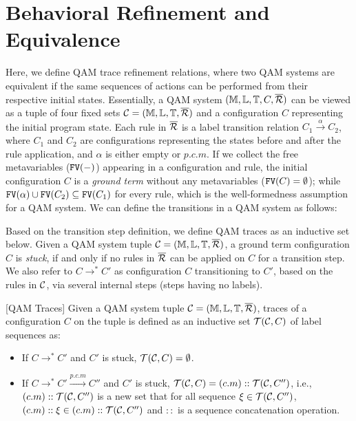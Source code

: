 \section{Behavioral Refinement and Equivalence} \label{sec:refinement}

Here, we define QAM trace refinement relations, where two QAM systems are equivalent if the same sequences of actions can be performed
from their respective initial states.
Essentially, a QAM system $(\mathbb{M},\mathbb{L},\mathbb{T},C,\overline{\mathcal{R}})$
can be viewed as a tuple of four fixed sets $\mathcal{C}=(\mathbb{M},\mathbb{L},\mathbb{T},\overline{\mathcal{R}})$
and a configuration $C$ representing the initial program state.
Each rule in $\overline{\mathcal{R}}$ is a label transition relation $C_1 \xrightarrow{\alpha} C_2$,
where $C_1$ and $C_2$ are configurations representing the states
before and after the rule application, and $\alpha$ is either empty or $p.c.m$.
If we collect the free metavariables ($\texttt{FV}(-)$) appearing in a configuration and rule, 
the initial configuration $C$ is a \textit{ground term} without any metavariables ($\texttt{FV}(C)=\emptyset$);
while $\texttt{FV}(\alpha) \cup \texttt{FV}(C_2)\subseteq \texttt{FV}(C_1)$ for every rule, which is the well-formedness assumption for a QAM system.
We can define the transitions in a QAM system as follows:



Based on the transition step definition, we define QAM traces as an inductive set below. Given a QAM system tuple $\mathcal{C}=(\mathbb{M},\mathbb{L},\mathbb{T},\overline{\mathcal{R}})$, a ground term configuration $C$ is \textit{stuck}, if and only if no rules in $\overline{\mathcal{R}}$ can be applied on $C$ for a transition step. We also refer to $C \longrightarrow^* C'$ as configuration $C$ transitioning to $C'$, based on the rules in $\mathcal{C}$, via several internal steps (steps having no labels).

\begin{definition}\label{def:traces}\rm[QAM Traces]
Given a QAM system tuple $\mathcal{C}=(\mathbb{M},\mathbb{L},\mathbb{T},\overline{\mathcal{R}})$, traces of a configuration $C$ on the tuple is defined as an inductive set $\mathcal{T}(\mathcal{C},C)$ of label sequences as:

\begin{itemize}
\item If $C \longrightarrow^* C'$ and $C'$ is stuck, $\mathcal{T}(\mathcal{C},C)=\emptyset$.
\item If $C \longrightarrow^* C' \xrightarrow{p.c.m} C''$ and $C'$ is stuck, $\mathcal{T}(\mathcal{C},C)=(c.m)::\mathcal{T}(\mathcal{C},C'')$, i.e., $(c.m)::\mathcal{T}(\mathcal{C},C'')$ is a new set that for all sequence $\xi \in \mathcal{T}(\mathcal{C},C'')$, $(c.m)::\xi \in (c.m)::\mathcal{T}(\mathcal{C},C'')$ and $::$ is a sequence concatenation operation.
\end{itemize}
\end{definition}

